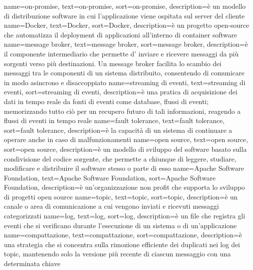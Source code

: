 {
    name={on-promise},
    text=on-promise,
    sort=on-promise,
    description={è un modello di distribuzione software in cui l'applicazione viene ospitata sul server del cliente}
}
{
    name={Docker},
    text=Docker,
    sort=Docker,
    description={è un progetto open-source che automatizza il deployment di applicazioni all'interno di container software}
}
{
    name={message broker},
    text=message broker,
    sort=message broker,
    description={è il componente intermediario che permette d' inviare e ricevere messaggi da più sorgenti verso più destinazioni. Un message broker facilita lo scambio dei messaggi 
    tra le componenti di un sistema distribuito, consentendo di comunicare in modo asincrono e disaccoppiato}
}
{
    name={streaming di eventi},
    text=streaming di eventi,
    sort=streaming di eventi,
    description={è una pratica di acquisizione dei dati in tempo reale da fonti di eventi come database, flussi
    di eventi; memorizzando tutto ciò per un recupero futuro di tali informazioni, reagendo a
    flussi di eventi in tempo reale}
}
{
    name={fault tolerance},
    text=fault tolerance,
    sort=fault tolerance,
    description={è la capacità di un sistema di continuare a operare anche in caso di malfunzionamenti}
}
{
    name={open source},
    text=open source,
    sort=open source,
    description={è un modello di sviluppo del software basato sulla condivisione del codice sorgente, che permette a chiunque di leggere, studiare, modificare e distribuire il software stesso o parte di esso}
}
{
    name={Apache Software Foundation},
    text=Apache Software Foundation,
    sort=Apache Software Foundation,
    description={è un'organizzazione non profit che supporta lo sviluppo di progetti open source}
}
{
    name={topic},
    text=topic,
    sort=topic,
    description={è un canale o area di comunicazione a cui vengono inviati e ricevuti messaggi categorizzati}
}
{
    name={log},
    text=log,
    sort=log,
    description={è un file che registra gli eventi che si verificano durante l'esecuzione di un sistema o di un'applicazione}
}
{
    name={compattazione},
    text=compattazione,
    sort=compattazione,
    description={è una strategia che si concentra sulla rimozione efficiente dei duplicati nei log dei topic, mantenendo solo la versione più recente di ciascun messaggio con una determinata chiave}
}
